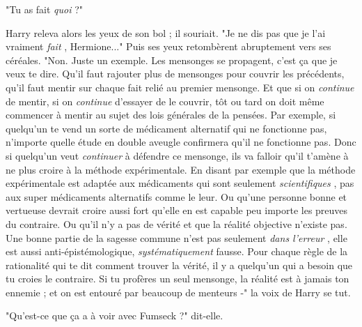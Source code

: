 "Tu as fait \emph{quoi}  ?"

Harry releva alors les yeux de son bol ; il souriait. "Je ne dis pas que je l'ai vraiment \emph{fait} , Hermione..." Puis ses yeux retombèrent abruptement vers ses céréales. "Non. Juste un exemple. Les mensonges se propagent, c'est ça que je veux te dire. Qu'il faut rajouter plus de mensonges pour couvrir les précédents, qu'il faut mentir sur chaque fait relié au premier mensonge. Et que si on \emph{continue}  de mentir, si on \emph{continue}  d'essayer de le couvrir, tôt ou tard on doit même commencer à mentir au sujet des lois générales de la pensées. Par exemple, si quelqu'un te vend un sorte de médicament alternatif qui ne fonctionne pas, n'importe quelle étude en double aveugle confirmera qu'il ne fonctionne pas. Donc si quelqu'un veut \emph{continuer}  à défendre ce mensonge, ils va falloir qu'il t'amène à ne plus croire à la méthode expérimentale. En disant par exemple que la méthode expérimentale est adaptée aux médicaments qui sont seulement \emph{scientifiques} , pas aux super médicaments alternatifs comme le leur. Ou qu'une personne bonne et vertueuse devrait croire aussi fort qu'elle en est capable peu importe les preuves du contraire. Ou qu'il n'y a pas de vérité et que la réalité objective n'existe pas. Une bonne partie de la sagesse commune n'est pas seulement \emph{dans l'erreur} , elle est aussi anti-épistémologique, \emph{systématiquement}  fausse. Pour chaque règle de la rationalité qui te dit comment trouver la vérité, il y a quelqu'un qui a besoin que tu croies le contraire. Si tu profères un seul mensonge, la réalité est à jamais ton ennemie ; et on est entouré par beaucoup de menteurs -" la voix de Harry se tut.

"Qu'est-ce que ça a à voir avec Fumseck ?" dit-elle.

